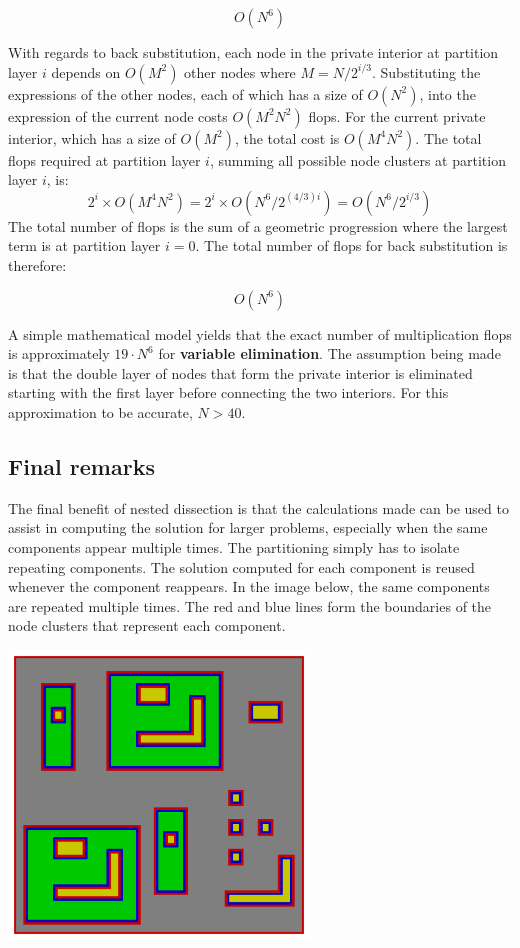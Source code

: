 \documentclass{article}
\begin{document}
\[O(N^6)\]

With regards to back substitution, each node in the private interior at partition layer \(i\) depends on \(O(M^2)\) other nodes where \(M = N/2^{i/3}\). Substituting the expressions of the other nodes, each of which has a size of \(O(N^2)\), into the expression of the current node costs \(O(M^2 N^2)\) flops. For the current private interior, which has a size of \(O(M^2)\), the total cost is \(O(M^4 N^2)\). The total flops required at partition layer \(i\), summing all possible node clusters at partition layer \(i\), is: 
\[2^i \times O(M^4 N^2) = 2^i \times O(N^6/2^{(4/3)i}) = O(N^6/2^{i/3})\]
The total number of flops is the sum of a geometric progression where the largest term is at partition layer \(i = 0\). The total number of flops for back substitution is therefore: 

\[O(N^6)\]

A simple mathematical model yields that the exact number of multiplication flops is approximately \(19 \cdot N^6\) for {\bf variable elimination}. The assumption being made is that the double layer of nodes that form the private interior is eliminated starting with the first layer before connecting the two interiors. For this approximation to be accurate, \(N > 40\).



\subsection{Final remarks}

The final benefit of nested dissection is that the calculations made can be used to assist in computing the solution for larger problems, especially when the same components appear multiple times. The partitioning simply has to isolate repeating components. The solution computed for each component is reused whenever the component reappears. In the image below, the same components are repeated multiple times. The red and blue lines form the boundaries of the node clusters that represent each component. 

\begin{center}
\includegraphics[width = 0.6\textwidth]{scenario_partitioning}
\end{center}
\end{document}

